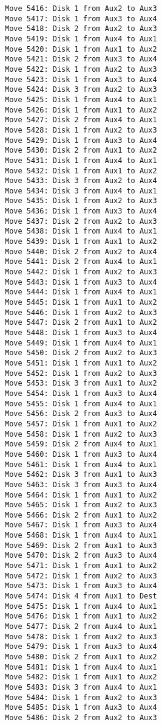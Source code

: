 \documentclass[11pt]{article}
\begin{document}
\begin{multicols}{2}
\begin{Verbatim}[fontsize=\small]
Move 5416: Disk 1 from Aux2 to Aux3
Move 5417: Disk 1 from Aux3 to Aux4
Move 5418: Disk 2 from Aux2 to Aux3
Move 5419: Disk 1 from Aux4 to Aux1
Move 5420: Disk 1 from Aux1 to Aux2
Move 5421: Disk 2 from Aux3 to Aux4
Move 5422: Disk 1 from Aux2 to Aux3
Move 5423: Disk 1 from Aux3 to Aux4
Move 5424: Disk 3 from Aux2 to Aux3
Move 5425: Disk 1 from Aux4 to Aux1
Move 5426: Disk 1 from Aux1 to Aux2
Move 5427: Disk 2 from Aux4 to Aux1
Move 5428: Disk 1 from Aux2 to Aux3
Move 5429: Disk 1 from Aux3 to Aux4
Move 5430: Disk 2 from Aux1 to Aux2
Move 5431: Disk 1 from Aux4 to Aux1
Move 5432: Disk 1 from Aux1 to Aux2
Move 5433: Disk 3 from Aux2 to Aux4
Move 5434: Disk 3 from Aux4 to Aux1
Move 5435: Disk 1 from Aux2 to Aux3
Move 5436: Disk 1 from Aux3 to Aux4
Move 5437: Disk 2 from Aux2 to Aux3
Move 5438: Disk 1 from Aux4 to Aux1
Move 5439: Disk 1 from Aux1 to Aux2
Move 5440: Disk 2 from Aux2 to Aux4
Move 5441: Disk 2 from Aux4 to Aux1
Move 5442: Disk 1 from Aux2 to Aux3
Move 5443: Disk 1 from Aux3 to Aux4
Move 5444: Disk 1 from Aux4 to Aux1
Move 5445: Disk 1 from Aux1 to Aux2
Move 5446: Disk 1 from Aux2 to Aux3
Move 5447: Disk 2 from Aux1 to Aux2
Move 5448: Disk 1 from Aux3 to Aux4
Move 5449: Disk 1 from Aux4 to Aux1
Move 5450: Disk 2 from Aux2 to Aux3
Move 5451: Disk 1 from Aux1 to Aux2
Move 5452: Disk 1 from Aux2 to Aux3
Move 5453: Disk 3 from Aux1 to Aux2
Move 5454: Disk 1 from Aux3 to Aux4
Move 5455: Disk 1 from Aux4 to Aux1
Move 5456: Disk 2 from Aux3 to Aux4
Move 5457: Disk 1 from Aux1 to Aux2
Move 5458: Disk 1 from Aux2 to Aux3
Move 5459: Disk 2 from Aux4 to Aux1
Move 5460: Disk 1 from Aux3 to Aux4
Move 5461: Disk 1 from Aux4 to Aux1
Move 5462: Disk 3 from Aux1 to Aux3
Move 5463: Disk 3 from Aux3 to Aux4
Move 5464: Disk 1 from Aux1 to Aux2
Move 5465: Disk 1 from Aux2 to Aux3
Move 5466: Disk 2 from Aux1 to Aux2
Move 5467: Disk 1 from Aux3 to Aux4
Move 5468: Disk 1 from Aux4 to Aux1
Move 5469: Disk 2 from Aux1 to Aux3
Move 5470: Disk 2 from Aux3 to Aux4
Move 5471: Disk 1 from Aux1 to Aux2
Move 5472: Disk 1 from Aux2 to Aux3
Move 5473: Disk 1 from Aux3 to Aux4
Move 5474: Disk 4 from Aux1 to Dest
Move 5475: Disk 1 from Aux4 to Aux1
Move 5476: Disk 1 from Aux1 to Aux2
Move 5477: Disk 2 from Aux4 to Aux1
Move 5478: Disk 1 from Aux2 to Aux3
Move 5479: Disk 1 from Aux3 to Aux4
Move 5480: Disk 2 from Aux1 to Aux2
Move 5481: Disk 1 from Aux4 to Aux1
Move 5482: Disk 1 from Aux1 to Aux2
Move 5483: Disk 3 from Aux4 to Aux1
Move 5484: Disk 1 from Aux2 to Aux3
Move 5485: Disk 1 from Aux3 to Aux4
Move 5486: Disk 2 from Aux2 to Aux3

\end{Verbatim}
\end{multicols}
\end{document}
